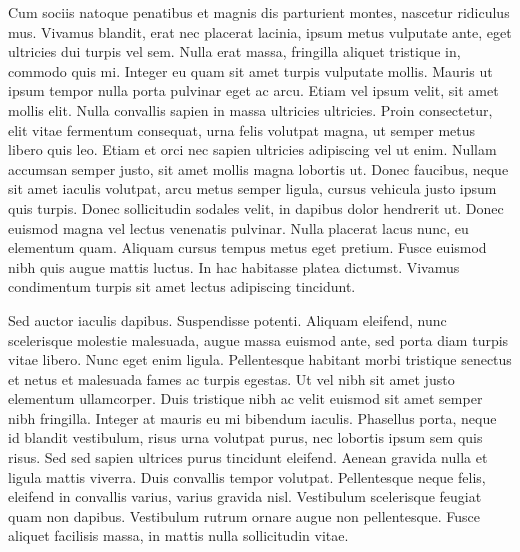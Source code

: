 Cum sociis natoque penatibus et magnis dis parturient montes, nascetur ridiculus mus. Vivamus blandit, erat nec placerat lacinia, ipsum metus vulputate ante, eget ultricies dui turpis vel sem. Nulla erat massa, fringilla aliquet tristique in, commodo quis mi. Integer eu quam sit amet turpis vulputate mollis. Mauris ut ipsum tempor nulla porta pulvinar eget ac arcu. Etiam vel ipsum velit, sit amet mollis elit. Nulla convallis sapien in massa ultricies ultricies. Proin consectetur, elit vitae fermentum consequat, urna felis volutpat magna, ut semper metus libero quis leo. Etiam et orci nec sapien ultricies adipiscing vel ut enim. Nullam accumsan semper justo, sit amet mollis magna lobortis ut. Donec faucibus, neque sit amet iaculis volutpat, arcu metus semper ligula, cursus vehicula justo ipsum quis turpis. Donec sollicitudin sodales velit, in dapibus dolor hendrerit ut. Donec euismod magna vel lectus venenatis pulvinar. Nulla placerat lacus nunc, eu elementum quam. Aliquam cursus tempus metus eget pretium. Fusce euismod nibh quis augue mattis luctus. In hac habitasse platea dictumst. Vivamus condimentum turpis sit amet lectus adipiscing tincidunt.

Sed auctor iaculis dapibus. Suspendisse potenti. Aliquam eleifend, nunc scelerisque molestie malesuada, augue massa euismod ante, sed porta diam turpis vitae libero. Nunc eget enim ligula. Pellentesque habitant morbi tristique senectus et netus et malesuada fames ac turpis egestas. Ut vel nibh sit amet justo elementum ullamcorper. Duis tristique nibh ac velit euismod sit amet semper nibh fringilla. Integer at mauris eu mi bibendum iaculis. Phasellus porta, neque id blandit vestibulum, risus urna volutpat purus, nec lobortis ipsum sem quis risus. Sed sed sapien ultrices purus tincidunt eleifend. Aenean gravida nulla et ligula mattis viverra. Duis convallis tempor volutpat. Pellentesque neque felis, eleifend in convallis varius, varius gravida nisl. Vestibulum scelerisque feugiat quam non dapibus. Vestibulum rutrum ornare augue non pellentesque. Fusce aliquet facilisis massa, in mattis nulla sollicitudin vitae. 
